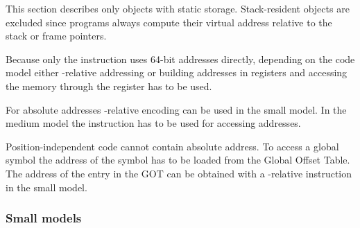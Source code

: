 This section describes only objects with static storage.
Stack-resident objects are excluded since programs always compute
their virtual address relative to the stack or frame pointers.

Because only the  instruction uses 64-bit addresses
directly, depending on the code model either \RIP-relative addressing
or building addresses in registers and accessing the memory through
the register has to be used.

For absolute addresses \RIP-relative encoding can be used in the small
model.  In the medium model the  instruction has to be
used for accessing addresses.

Position-independent code cannot contain absolute address.  To access
a global symbol the address of the symbol has to be loaded from the
Global Offset Table.  The address of the entry in the GOT can be
obtained with a \RIP-relative instruction in the small model.

\subsubsection{Small models}

